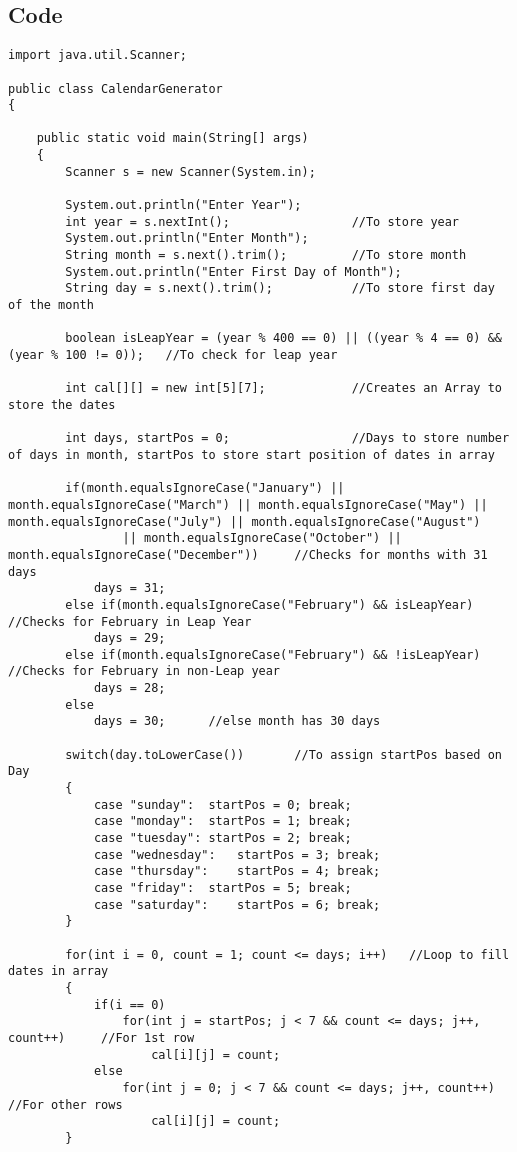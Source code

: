 \documentclass[ProgramminAssignment.tex]{subfiles}
\begin{document}
\subsection{Code}
\begin{lstlisting}
import java.util.Scanner;

public class CalendarGenerator
{

	public static void main(String[] args)
	{
		Scanner s = new Scanner(System.in);
		
		System.out.println("Enter Year");
		int year = s.nextInt();					//To store year
		System.out.println("Enter Month");
		String month = s.next().trim();			//To store month
		System.out.println("Enter First Day of Month");
		String day = s.next().trim();			//To store first day of the month
		
		boolean isLeapYear = (year % 400 == 0) || ((year % 4 == 0) && (year % 100 != 0));	//To check for leap year
		
		int cal[][] = new int[5][7];			//Creates an Array to store the dates
		
		int days, startPos = 0;					//Days to store number of days in month, startPos to store start position of dates in array
		
		if(month.equalsIgnoreCase("January") || month.equalsIgnoreCase("March") || month.equalsIgnoreCase("May") || month.equalsIgnoreCase("July") || month.equalsIgnoreCase("August")
				|| month.equalsIgnoreCase("October") || month.equalsIgnoreCase("December"))		//Checks for months with 31 days
			days = 31;
		else if(month.equalsIgnoreCase("February") && isLeapYear)		//Checks for February in Leap Year
			days = 29;
		else if(month.equalsIgnoreCase("February") && !isLeapYear)		//Checks for February in non-Leap year
			days = 28;
		else
			days = 30;		//else month has 30 days
		
		switch(day.toLowerCase())		//To assign startPos based on Day
		{
			case "sunday":	startPos = 0; break;
			case "monday":	startPos = 1; break;
			case "tuesday":	startPos = 2; break;
			case "wednesday":	startPos = 3; break;
			case "thursday":	startPos = 4; break;
			case "friday":	startPos = 5; break;
			case "saturday":	startPos = 6; break;
		}
		
		for(int i = 0, count = 1; count <= days; i++)	//Loop to fill dates in array
		{
			if(i == 0)
				for(int j = startPos; j < 7 && count <= days; j++, count++)		//For 1st row
					cal[i][j] = count;
			else
				for(int j = 0; j < 7 && count <= days; j++, count++)		//For other rows
					cal[i][j] = count;
		}
		

\end{lstlisting}
\end{document}
